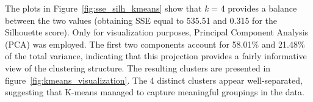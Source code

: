 The plots in Figure~\ref{fig:sse_silh_kmeans} show that \textit{k} = 4 provides a balance between the two values (obtaining SSE equal to 535.51 and 0.315 for the Silhouette score).
Only for visualization purposes, Principal Component Analysis (PCA) was employed. 
The first two components account for 58.01\% and 21.48\% of the total variance, indicating that this projection provides a fairly informative view of the clustering structure. 
The resulting clusters are presented in figure~\ref{fig:kmeans_visualization}. 
The 4 distinct clusters appear well-separated, suggesting that K-means managed to capture meaningful groupings in the data.




 

